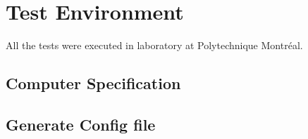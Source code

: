 \section{Test Environment}

All the tests were executed in laboratory at Polytechnique Montréal.




\subsection{Computer Specification}

\subsection{Generate Config file}



